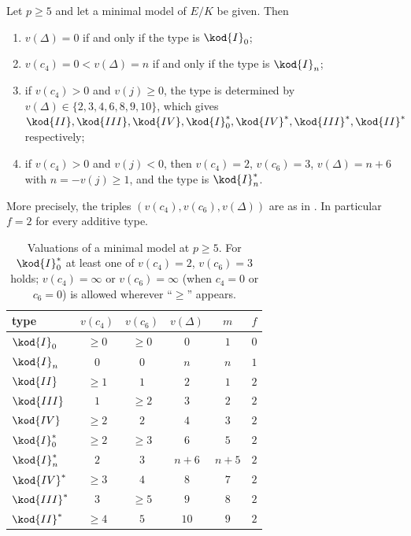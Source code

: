 \begin{corollary}\label{cor:reduction:tame-table}
Let $p\ge5$ and let a minimal model of $E/K$ be given. Then
\begin{enumerate}[label=(\roman*)]
\item $v(\Delta)=0$ if and only if the type is $\kod{I}_0$;
\item $v(c_4)=0<v(\Delta)=n$ if and only if the type is $\kod{I}_n$;
\item if $v(c_4)>0$ and $v(j)\ge0$, the type is determined by $v(\Delta)\in\{2,3,4,6,8,9,10\}$, which gives
$\kod{II},\kod{III},\kod{IV},\kod{I}_0^*,\kod{IV}^*,\kod{III}^*,\kod{II}^*$ respectively;
\item if $v(c_4)>0$ and $v(j)<0$, then $v(c_4)=2$, $v(c_6)=3$, $v(\Delta)=n+6$ with $n=-v(j)\ge1$, and the type is
$\kod{I}_n^*$.
\end{enumerate}
More precisely, the triples $(v(c_4),v(c_6),v(\Delta))$ are as in . In particular $f=2$
for every additive type.
\end{corollary}

\begin{table}[ht]
\centering\small
\begin{tabular}{lccccc}
\toprule
type & $v(c_4)$ & $v(c_6)$ & $v(\Delta)$ & $m$ & $f$\\
\midrule
$\kod{I}_0$ & $\ge0$ & $\ge0$ & $0$ & $1$ & $0$\\
$\kod{I}_n$ & $0$ & $0$ & $n$ & $n$ & $1$\\
$\kod{II}$ & $\ge1$ & $1$ & $2$ & $1$ & $2$\\
$\kod{III}$ & $1$ & $\ge2$ & $3$ & $2$ & $2$\\
$\kod{IV}$ & $\ge2$ & $2$ & $4$ & $3$ & $2$\\
$\kod{I}_0^*$ & $\ge2$ & $\ge3$ & $6$ & $5$ & $2$\\
$\kod{I}_n^*$ & $2$ & $3$ & $n+6$ & $n+5$ & $2$\\
$\kod{IV}^*$ & $\ge3$ & $4$ & $8$ & $7$ & $2$\\
$\kod{III}^*$ & $3$ & $\ge5$ & $9$ & $8$ & $2$\\
$\kod{II}^*$ & $\ge4$ & $5$ & $10$ & $9$ & $2$\\
\bottomrule
\end{tabular}
\caption{Valuations of a minimal model at $p\ge5$. For $\kod{I}_0^*$ at least one of $v(c_4)=2$, $v(c_6)=3$ holds;
$v(c_4)=\infty$ or $v(c_6)=\infty$ (when $c_4=0$ or $c_6=0$) is allowed wherever ``$\ge$'' appears.}\label{tab:reduction:tame}
\end{table}

